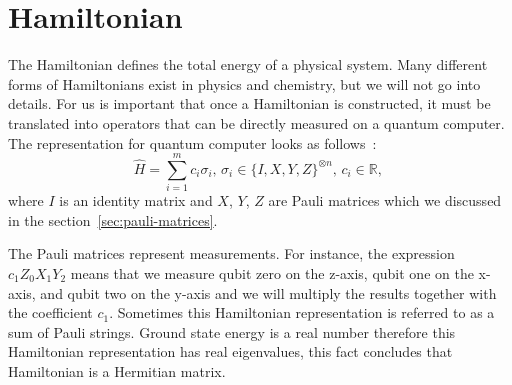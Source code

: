 \section{Hamiltonian}
The Hamiltonian defines the total energy of a physical system. Many different forms of Hamiltonians exist in physics and chemistry, but we will not go into details. For us is important that once a Hamiltonian is constructed, it must be translated into operators that can be directly measured on a quantum computer. The representation for quantum computer looks as follows~\cite{fedorov2021vqe}:
\begin{equation*}
\hat{H} = \sum_{i=1}^{m}c_i\sigma_i \text{, } \sigma_i \in \{I, X, Y, Z\}^{\otimes n}\text{, } c_i \in \mathbb{R} \text{, }
\end{equation*}
where $I$ is an identity matrix and $X$, $Y$, $Z$ are Pauli matrices which we discussed in the section~\ref{sec:pauli-matrices}.

The Pauli matrices represent measurements. For instance, the expression $c_{1}Z_{0}X_{1}Y_{2}$ means that we measure qubit zero on the z-axis, qubit one on the x-axis, and qubit two on the y-axis and we will multiply the results together with the coefficient $c_{1}$. Sometimes this Hamiltonian representation is referred to as a sum of Pauli strings. Ground state energy is a real number therefore this Hamiltonian representation has real eigenvalues, this fact concludes that Hamiltonian is a Hermitian matrix.